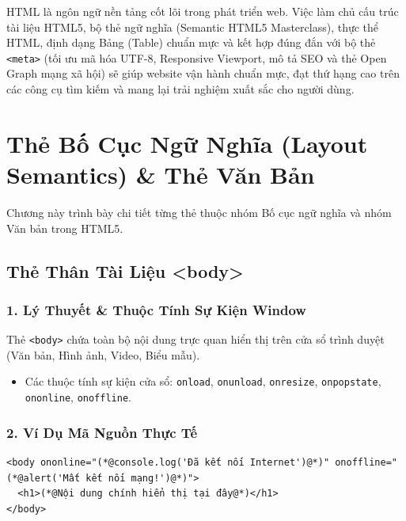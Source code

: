 \documentclass[11pt,oneside]{book}
\newcommand{\codeinline}[1]{\textcolor{accentOrange}{\texttt{#1}}}
\begin{document}
\begin{noteBox}
HTML là ngôn ngữ nền tảng cốt lõi trong phát triển web. Việc làm chủ cấu trúc tài liệu HTML5, bộ thẻ ngữ nghĩa (Semantic HTML5 Masterclass), thực thể HTML, định dạng Bảng (Table) chuẩn mực và kết hợp đúng đắn với bộ thẻ \codeinline{<meta>} (tối ưu mã hóa UTF-8, Responsive Viewport, mô tả SEO và thẻ Open Graph mạng xã hội) sẽ giúp website vận hành chuẩn mực, đạt thứ hạng cao trên các công cụ tìm kiếm và mang lại trải nghiệm xuất sắc cho người dùng.
\end{noteBox}




\chapter{Thẻ Bố Cục Ngữ Nghĩa (Layout Semantics) \& Thẻ Văn Bản}
\label{chap:semantic_structure}

Chương này trình bày chi tiết từng thẻ thuộc nhóm Bố cục ngữ nghĩa và nhóm Văn bản trong HTML5.

\section{Thẻ Thân Tài Liệu <body>}
\subsection{1. Lý Thuyết \& Thuộc Tính Sự Kiện Window}
Thẻ \codeinline{<body>} chứa toàn bộ nội dung trực quan hiển thị trên cửa sổ trình duyệt (Văn bản, Hình ảnh, Video, Biểu mẫu).

\begin{itemize}
    \item Các thuộc tính sự kiện cửa sổ: \codeinline{onload}, \codeinline{onunload}, \codeinline{onresize}, \codeinline{onpopstate}, \codeinline{ononline}, \codeinline{onoffline}.
\end{itemize}

\subsection{2. Ví Dụ Mã Nguồn Thực Tế}
\begin{codeWindow}
\begin{lstlisting}[language=HTML5]
<body ononline="(*@console.log('Đã kết nối Internet')@*)" onoffline="(*@alert('Mất kết nối mạng!')@*)">
  <h1>(*@Nội dung chính hiển thị tại đây@*)</h1>
</body>
\end{lstlisting}
\end{codeWindow}
\end{document}
